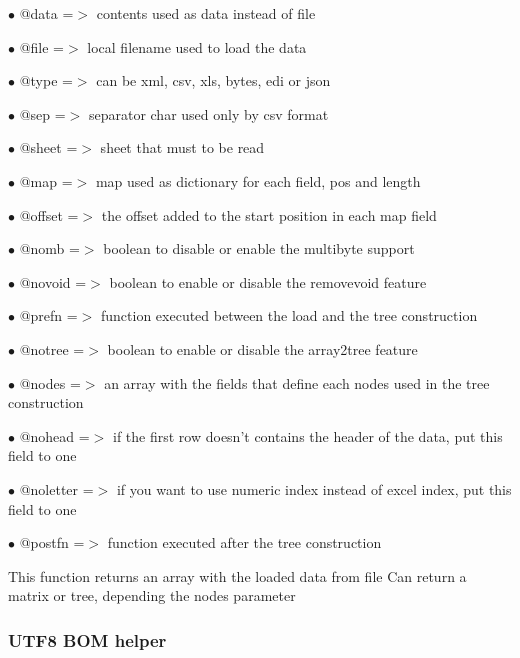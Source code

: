 \documentclass[a4paper]{article}
\begin{document}
\begin{compactitem}
\item[\color{myblue}$\bullet$] @data     =$>$ contents used as data instead of file
\item[\color{myblue}$\bullet$] @file     =$>$ local filename used to load the data
\item[\color{myblue}$\bullet$] @type     =$>$ can be xml, csv, xls, bytes, edi or json
\item[\color{myblue}$\bullet$] @sep      =$>$ separator char used only by csv format
\item[\color{myblue}$\bullet$] @sheet    =$>$ sheet that must to be read
\item[\color{myblue}$\bullet$] @map      =$>$ map used as dictionary for each field, pos and length
\item[\color{myblue}$\bullet$] @offset   =$>$ the offset added to the start position in each map field
\item[\color{myblue}$\bullet$] @nomb     =$>$ boolean to disable or enable the multibyte support
\item[\color{myblue}$\bullet$] @novoid   =$>$ boolean to enable or disable the removevoid feature
\item[\color{myblue}$\bullet$] @prefn    =$>$ function executed between the load and the tree construction
\item[\color{myblue}$\bullet$] @notree   =$>$ boolean to enable or disable the array2tree feature
\item[\color{myblue}$\bullet$] @nodes    =$>$ an array with the fields that define each nodes used in the tree construction
\item[\color{myblue}$\bullet$] @nohead   =$>$ if the first row doesn't contains the header of the data, put this field to one
\item[\color{myblue}$\bullet$] @noletter =$>$ if you want to use numeric index instead of excel index, put this field to one
\item[\color{myblue}$\bullet$] @postfn   =$>$ function executed after the tree construction
\end{compactitem}

This function returns an array with the loaded data from file
Can return a matrix or tree, depending the nodes parameter

\hypertarget{toc464}{}
\subsubsection{UTF8 BOM helper}
\end{document}
